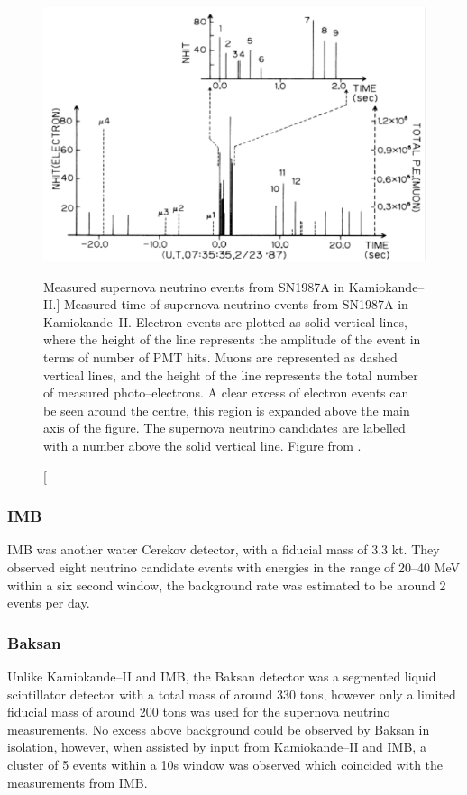 \begin{figure}
	\centering
	\includegraphics{figures/kami_1987.pdf}
	\caption
	[Measured supernova neutrino events from SN1987A in Kamiokande--II.]
	{Measured time of supernova neutrino events from SN1987A in Kamiokande--II. 
	Electron events are plotted as solid vertical lines, where the height of the 
	line represents the amplitude of the event in terms of number of PMT hits. 
	Muons are represented as dashed vertical lines, and the height of the line 
	represents the total number of measured photo--electrons. A clear excess of 
	electron events can be seen around the centre, this region is expanded above 
	the main axis of the figure. The supernova neutrino candidates are labelled
	with a number above the solid vertical line. Figure from 
	\cite{Hirata:1987hu}.}
	\label{fig:kami_1987}
\end{figure}

\subsubsection{IMB}
IMB was another water Cerekov detector, with a fiducial mass of 3.3 kt. They
observed eight neutrino candidate events with energies in the range of 20--40
MeV within a six second window, the background rate was estimated to be around 2
events per day\cite{PhysRevLett.58.1494}.

\subsubsection{Baksan}
Unlike Kamiokande--II and IMB, the Baksan detector was a segmented liquid
scintillator detector with a total mass of around 330 tons, however only a
limited fiducial mass of around 200 tons was used for the supernova neutrino
measurements. No excess above background could be observed by Baksan
in isolation, however, when assisted by input from Kamiokande--II and IMB, a
cluster of 5 events within a 10s window was observed which coincided with the
measurements from IMB\cite{Loredo:2001rx}.

